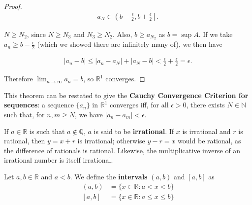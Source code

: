 \documentclass[12pt]{article}
\begin{document}
\begin{thm}
\begin{proof}
    \begin{align*}
      a_N \in \left( b - \frac{\epsilon}{2}, b + \frac{\epsilon}{2} \right].
    \end{align*}

    $N \geq N_2$, since $N \geq N_3$ and $N_3 \geq N_2$. Also, $b \geq a_{N_2}$ as $b
    = \sup A$. If we take $a_n \geq b - \frac{\epsilon}{2}$ (which we showed there
    are infinitely many of), we then have

    \begin{align*}
      |a_n - b| \leq |a_n - a_N| + |a_N - b| < \frac{\epsilon}{2} + \frac{\epsilon}{2} = \epsilon.
    \end{align*}

    Therefore $\lim_{n \to \infty} a_n = b$, so $\mathbb{R}^1$ converges.
  \end{proof}
\end{thm}

\begin{comm}
  This theorem can be restated to give the \textbf{Cauchy Convergence Criterion for
  sequences}: a sequence $\{a_n\}$ in $\mathbb{R}^1$ converges iff, for all $\epsilon
  > 0$, there exists $N \in \mathbb{N}$ such that, for $n,m \geq N$, we have $|a_n -
  a_m| < \epsilon$.
\end{comm}

\begin{defn}
  If $a \in \mathbb{R}$ is such that $a \notin \mathbb{Q}$, $a$ is said to be
  \textbf{irrational}. If $x$ is irrational and $r$ is rational, then $y = x + r$ is
  irrational; otherwise $y - r = x$ would be rational, as the difference of rationals
  is rational. Likewise, the multiplicative inverse of an irrational number is itself
  irrational.
\end{defn}

\begin{defn}
  Let $a,b \in \mathbb{R}$ and $a < b$. We define the \textbf{intervals} $(a,b)$ and
  $[a,b]$ as
  \begin{align*}
    (a,b) &= \{x \in \mathbb{R}: a < x < b\}\\
    [a,b] &= \{x \in \mathbb{R}: a \leq x \leq b\}
  \end{align*}
\end{defn}
\end{document}
